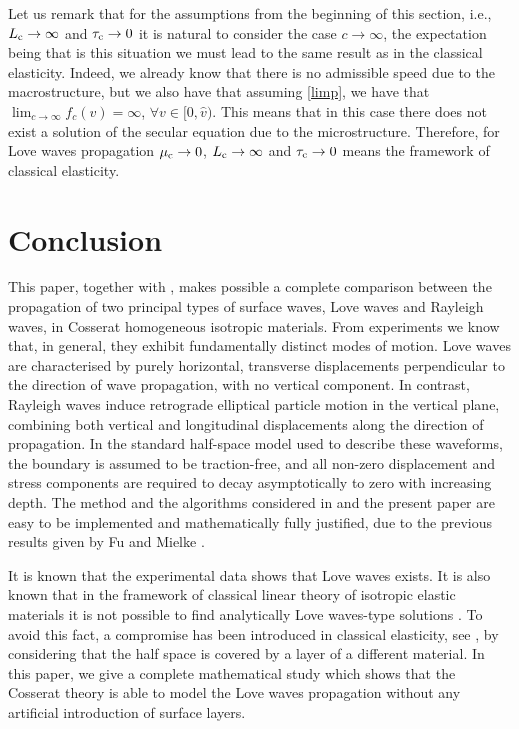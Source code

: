 \documentclass[10pt]{article}
\begin{document}
Let us remark that for the assumptions from the beginning of this section, i.e., $ L_{\rm c}\to \infty$ and $ \tau_{\rm c}\to 0$ it is natural to consider the case $c\to \infty$, the expectation being that is this situation we must lead to the same result as in the classical elasticity. Indeed, we already know that there is no admissible speed due to the macrostructure, but we also have  that assuming \eqref{limp}, we have  that
 $\lim_{c\to \infty} f_c(v)=\infty$, $\forall v\in[0,\widehat{v})$. This means that in  this case there does not exist a solution of the secular equation due to the microstructure. Therefore, for Love waves propagation $\mu_{\rm c}\to 0$, $ L_{\rm c}\to \infty$ and $ \tau_{\rm c}\to 0$  means the framework of classical elasticity. 

\section{Conclusion}


This paper, together with \cite{ghiba2023cosserat}, makes possible a complete comparison between the propagation of two principal types of surface waves, Love waves and Rayleigh waves, in Cosserat homogeneous isotropic materials. From experiments we know that, in general, they exhibit fundamentally distinct modes of motion. Love waves are characterised by purely horizontal, transverse displacements perpendicular to the direction of wave propagation, with no vertical component. In contrast, Rayleigh waves induce retrograde elliptical particle motion in the vertical plane, combining both vertical and longitudinal displacements along the direction of propagation. In the standard half-space model used to describe these waveforms, the boundary is assumed to be traction-free, and all non-zero displacement and stress components are required to decay asymptotically to zero with increasing depth. The method and the algorithms considered in \cite{ghiba2023cosserat} and the present paper are easy to be implemented and mathematically fully justified, due to the previous results given by Fu and Mielke \cite{fu2001nonlinear,mielke2004uniqueness}. 

It is known that the experimental data shows that Love waves exists. It is also known that in the framework of  classical linear theory of isotropic  elastic materials it is not possible to find analytically Love waves-type solutions \cite{Achenbach}. To avoid this fact,  a compromise has been introduced in classical elasticity, see \cite[page 219]{Achenbach}, by considering that the half space is covered by a layer of a different material. In this paper, we give a complete mathematical study which shows that the Cosserat theory is able to model the Love waves propagation without  any artificial introduction of surface layers. 
\end{document}
